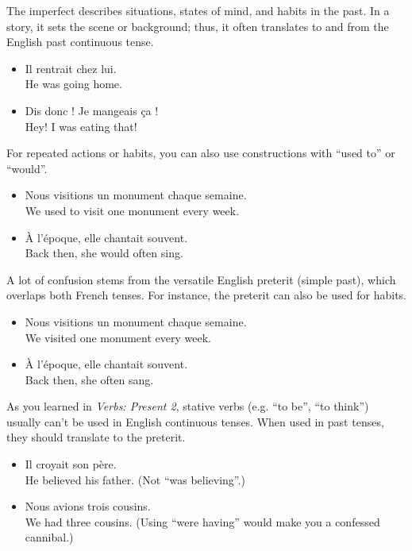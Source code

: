 The imperfect describes situations, states of mind, and habits in the past. In a story, it sets the scene or background; thus, it often translates to and from the English past continuous tense.

\begin{itemize}
  \item  Il rentrait chez lui. \\ He was going home.
	\item  Dis donc ! Je mangeais {\c c}a ! \\ Hey! I was eating that!
\end{itemize}

For repeated actions or habits, you can also use constructions with ``used to'' or ``would''.

\begin{itemize}
  \item  Nous visitions un monument chaque semaine. \\ We used to visit one monument every week.
	\item  {\`A} l'{\'e}poque, elle chantait souvent. \\ Back then, she would often sing.
\end{itemize}

A lot of confusion stems from the versatile English preterit (simple past), which overlaps both French tenses. For instance, the preterit can also be used for habits.

\begin{itemize}
  \item  Nous visitions un monument chaque semaine. \\ We visited one monument every week.
	\item  {\`A} l'{\'e}poque, elle chantait souvent. \\ Back then, she often sang.
\end{itemize}

As you learned in \textit{Verbs: Present 2}, stative verbs (e.g. ``to be'', ``to think'') usually can't be used in English continuous tenses. When used in past tenses, they should translate to the preterit.

\begin{itemize}
  \item  Il croyait son p{\`e}re. \\ He believed his father. (Not ``was believing''.)
	\item  Nous avions trois cousins. \\ We had three cousins. (Using ``were having'' would make you a confessed cannibal.)
\end{itemize}

